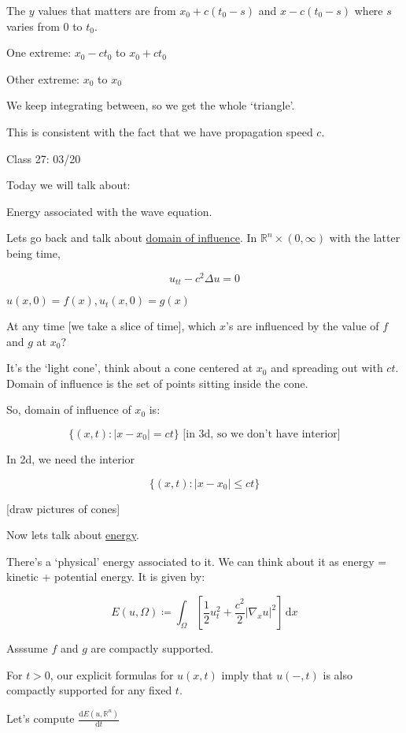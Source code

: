 \documentclass{article}
\theoremstyle{definition}
\begin{document}
The \(y\) values that matters are from \(x_0 + c(t_0-s)\) and \(x - c(t_0-s)\) where \(s\) varies from \(0\) to \(t_0\).

One extreme: \(x_0 - ct_0\) to \(x_0 + ct_0\) 

Other extreme: \(x_0\) to \(x_0\)

We keep integrating between, so we get the whole `triangle'.

This is consistent with the fact that we have propagation speed \(c\).

\hrulefill

Class 27: 03/20

Today we will talk about:

Energy associated with the wave equation.

Lets go back and talk about \underline{domain of influence}. In \(\mathbb{R}^n\times (0,\infty)\)  with the latter being time,

\[
    u_{t t} - c^2 \Delta u = 0
\]

\(u(x,0)=f(x),u_t(x,0)=g(x)\) 

At any time [we take a slice of time], which \(x\)'s are influenced by the value of \(f\) and \(g\) at \(x_0\)?

It's the `light cone', think about a cone centered at \(x_0\) and spreading out with \(ct\). Domain of influence is the set of points sitting inside the cone.

So, domain of influence of \(x_0\) is:

\[
    \{ (x,t):\vert x - x_0 \vert = ct \} \text{ [in 3d, so we don't have interior]} 
\]

In 2d, we need the interior

\[
    \{ (x,t): \vert x - x_0 \vert \leq ct \} 
\]

[draw pictures of cones]

Now lets talk about \underline{energy}.

There's a `physical' energy associated to it. We can think about it as energy = kinetic + potential energy. It is given by:

\[
    E(u,\Omega)\coloneqq \int_{\Omega}^{} \left[ \frac{1}{2} u_t^2 + \frac{c^2}{2} \vert \nabla_x u \vert ^2 \right] \,\mathrm{d}x 
\]

Asssume \(f\) and \(g\) are compactly supported.

For \(t > 0\), our explicit formulas for \(u(x,t)\) imply that \(u(-,t)\) is also compactly supported for any fixed \(t\).

Let's compute \(\frac{\mathrm{d}E(u,\mathbb{R}^n)}{\mathrm{d}t} \)
\end{document}
